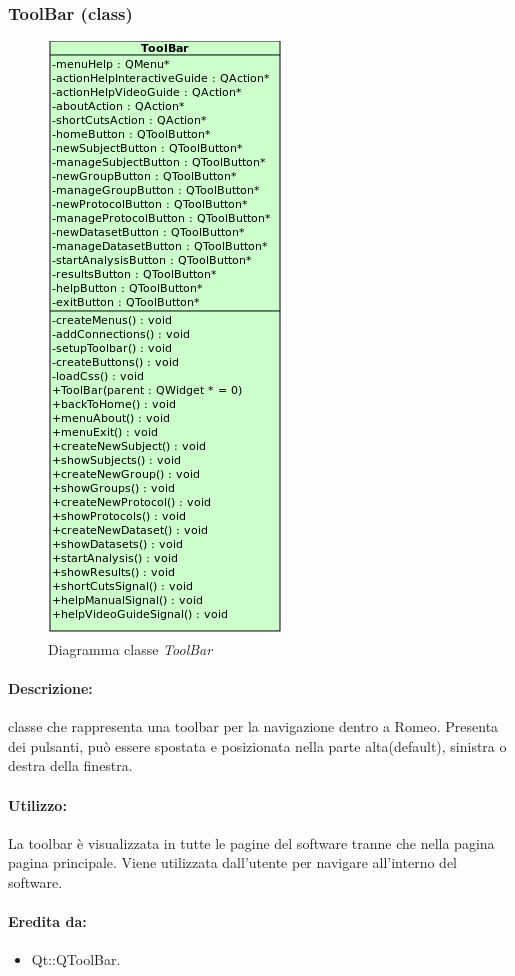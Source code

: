 	\subsubsection{ToolBar (class)}
	\begin{figure}[!h]
		\centering
		\includegraphics[scale=2.75]{./Content/Immagini/view/ToolBar}
		\caption{Diagramma classe \textsl{ToolBar}}
	\end{figure}
	\paragraph{Descrizione:} classe che rappresenta una toolbar per la navigazione dentro a Romeo\g{}.
Presenta dei pulsanti, può essere spostata e posizionata nella parte alta(default), sinistra o destra della finestra.
	\paragraph{Utilizzo:} La toolbar è visualizzata in tutte le pagine del software tranne che nella pagina pagina principale. Viene utilizzata dall'utente per navigare all'interno del software.
	\paragraph{Eredita da:}
		\begin{itemize}
			\item Qt::QToolBar.
		\end{itemize}
